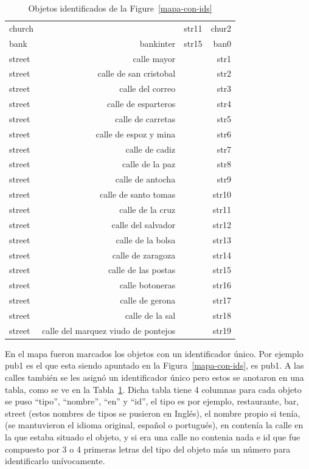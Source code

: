 \begin{table}[!t]
\begin{small}
\begin{center}
\begin{tabular}{|l|r|r|r|}
church & & str11 & chur2\\
bank & bankinter & str15 & ban0\\
street & calle mayor & & str1 \\
street & calle de san cristobal & & str2\\
street & calle del correo & & str3\\
street & calle de esparteros & & str4\\
street & calle de carretas & & str5\\
street & calle de espoz y mina & & str6\\
street & calle de cadiz & & str7\\
street & calle de la paz & & str8\\
street & calle de antocha & & str9\\
street & calle de santo tomas & & str10\\
street & calle de la cruz & & str11\\
street & calle del salvador & & str12\\
street & calle de la bolsa & & str13\\
street & calle de zaragoza & & str14\\
street & calle de las postas & & str15\\
street & calle botoneras & & str16\\
street & calle de gerona & & str17\\
street & calle de la sal & & str18\\
street & calle del marquez viudo de pontejos & & str19\\
\hline
\end{tabular}
\caption{Objetos identificados de la Figure~\ref{mapa-con-ids}\label{tabla-ids}}
\vspace*{-.5cm}
\end{center}
\end{small}
\end{table}

En el mapa fueron marcados los objetos con un identificador \'unico. Por ejemplo pub1 es el que esta siendo apuntado en la Figura~\ref{mapa-con-ids}, es pub1. A las calles tambi\'en se les asign\'o un identificador \'unico pero estos se anotaron en una tabla, como se ve en la Tabla~\ref{tabla-ids}. Dicha tabla tiene 4 columnas para cada objeto se puso ``tipo'', ``nombre'', ``en'' y ``id'', el tipo es por ejemplo, restaurante, bar, street (estos nombres de tipos se pusieron en Ingl\'es), el nombre propio si ten\'ia, (se mantuvieron el idioma original, espa\~nol o portugu\'es), en conten\'ia la calle en la que estaba situado el objeto, y si era una calle no contenia nada e id que fue compuesto por 3 o 4 primeras letras del tipo del objeto m\'as un n\'umero para identificarlo un\'ivocamente.   \\

